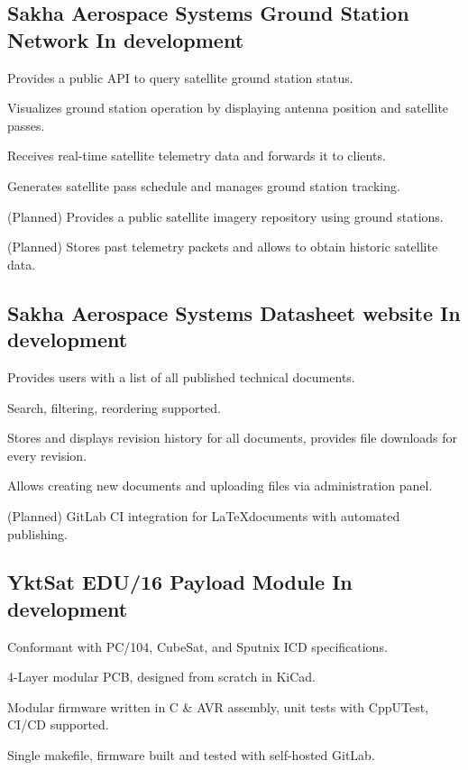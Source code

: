 \documentclass[letter,10pt]{article}
\begin{document}
\subsection{{Sakha Aerospace Systems Ground Station Network \hfill In development}}
\begin{zitemize}
\item Provides a public API to query satellite ground station status.
\item Visualizes ground station operation by displaying antenna position and satellite passes.
\item Receives real-time satellite telemetry data and forwards it to clients.
\item Generates satellite pass schedule and manages ground station tracking.
\item (Planned) Provides a public satellite imagery repository using ground stations.
\item (Planned) Stores past telemetry packets and allows to obtain historic satellite data.
\end{zitemize}

\subsection{{Sakha Aerospace Systems Datasheet website \hfill In development}}
\begin{zitemize}
\item Provides users with a list of all published technical documents.
\item Search, filtering, reordering supported.
\item Stores and displays revision history for all documents, provides file downloads for every revision.
\item Allows creating new documents and uploading files via administration panel.
\item (Planned) GitLab CI integration for \LaTeX documents with automated publishing.
\end{zitemize}

\subsection{{YktSat EDU/16 Payload Module \hfill In development}}
\begin{zitemize}
\item Conformant with PC/104, CubeSat, and Sputnix ICD specifications.
\item 4-Layer modular PCB, designed from scratch in KiCad.
\item Modular firmware written in C \& AVR assembly, unit tests with CppUTest, CI/CD supported.
\item Single makefile, firmware built and tested with self-hosted GitLab.
\end{zitemize}
\end{document}
